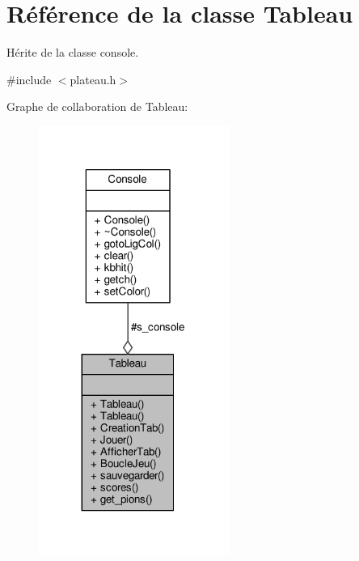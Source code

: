 \hypertarget{classTableau}{}\section{Référence de la classe Tableau}
\label{classTableau}


Hérite de la classe console.  




{\ttfamily \#include $<$plateau.\+h$>$}



Graphe de collaboration de Tableau\+:\nopagebreak
\begin{figure}[H]
\begin{center}
\leavevmode
\includegraphics[width=176pt]{classTableau__coll__graph}
\end{center}
\end{figure}
